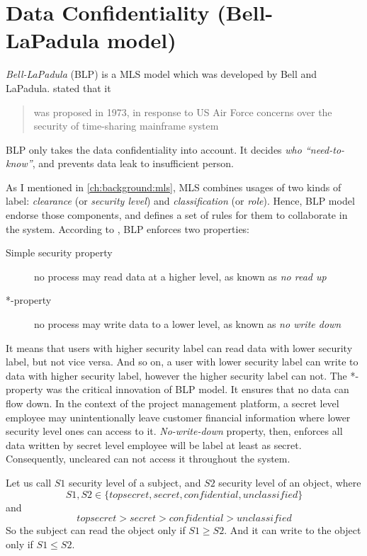 
\section{Data Confidentiality (Bell-LaPadula model)}
\label{ch:background:bell}

\emph{Bell-LaPadula} (BLP) is a MLS model which was developed by Bell and LaPadula.
\citeauthor{ross:2008} \cite{ross:2008} stated that it \begin{quote}was proposed in 1973, in response to US Air Force concerns over the security of time-sharing mainframe system\end{quote}
BLP only takes the data confidentiality into account.
It decides \emph{who ``need-to-know''}, and prevents data leak to insufficient person.

As I mentioned in \autoref{ch:background:mls}, MLS combines usages of two kinds of label: \emph{clearance} (or \emph{security level}) and \emph{classification} (or \emph{role}).
Hence, BLP model endorse those components, and defines a set of rules for them to collaborate in the system.
According to \cite{ross:2008}, BLP enforces two properties:
\begin{description}
\item[Simple security property] no process may read data at a higher level, as known as \emph{no read up}
\item[*-property] no process may write data to a lower level, as known as \emph{no write down}
\end{description}
It means that users with higher security label can read data with lower security label, but not vice versa.
And so on, a user with lower security label can write to data with higher security label, however the higher security label can not.
The *-property was the critical innovation of BLP model.
It ensures that no data can flow down.
In the context of the project management platform, a secret level employee may unintentionally leave customer financial information where lower security level ones can access to it.
\emph{No-write-down} property, then, enforces all data written by secret level employee will be label at least as secret.
Consequently, uncleared can not access it throughout the system.

Let us call $S1$ security level of a subject, and $S2$ security level of an object, where 
$$S1,S2 \in \{top secret, secret, confidential, unclassified\}$$ 
and 
$$top secret > secret > confidential > unclassified$$
So the subject can read the object only if $S1 \geq S2$.
And it can write to the object only if $S1 \leq S2$.

